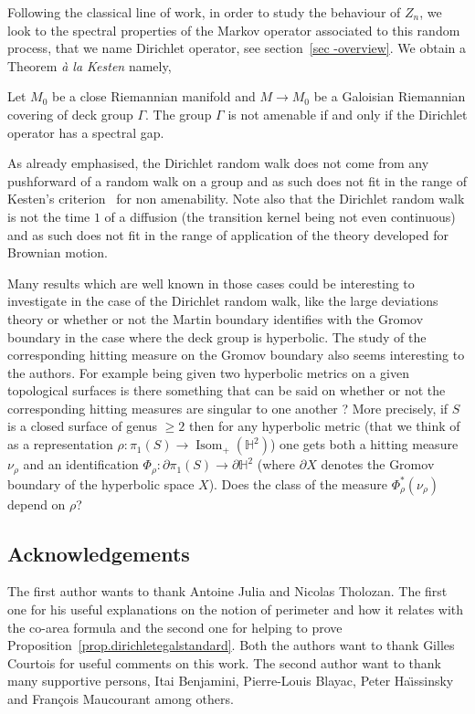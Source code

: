 \documentclass[AHL,Unicode,longabstracts,published]{cedram}
\DeclareMathOperator{\Isom}{Isom}
\newcommand{\HH}{\mathbb{H}}
\newcommand{\G}{\Gamma}
\begin{document}
Following the classical line of work, in order to study the behaviour of $Z_n$, we look to the spectral properties of the Markov operator associated to this random process, that we name Dirichlet operator, see section~\ref{sec -overview}. We obtain a Theorem \emph{à la Kesten} namely,

\begin{theo}\label{theo-Kesten for Dirichlet}
\label{theo-spectral gap}
Let $M_0$ be a close Riemannian manifold and $M \to M_0$ be a Galoisian Riemannian covering of deck group $\Gamma$. The group $\G$ is not amenable if and only if the Dirichlet operator has a spectral gap.
\end{theo}

As already emphasised, the Dirichlet random walk does not come from any pushforward of a random walk on a group and as such does not fit in the range of Kesten's criterion~\cite{artkestenamenable} for non amenability. Note also that the Dirichlet random walk is not the time $1$ of a diffusion (the transition kernel being not even continuous) and as such does not fit in the range of application of the theory developed for Brownian motion. 


Many results which are well known in those cases could be interesting to investigate in the case of the Dirichlet random walk, like the large deviations theory or whether or not the Martin boundary identifies with the Gromov boundary in the case where the deck group is hyperbolic. The study of the corresponding hitting measure on the Gromov boundary also seems interesting to the authors. For example being given two hyperbolic metrics on a given topological surfaces is there something that can be said on whether or not the corresponding hitting measures are singular to one another ? More precisely, if $S$ is a closed surface of genus $\ge 2$ then for any hyperbolic metric (that we think of as a representation $\rho : \pi_1(S) \to \Isom_+(\HH^2)$) one gets both a hitting measure $\nu_\rho$ and an identification $\Phi_{\rho} : \partial \pi_1(S) \to \partial \HH^2$ (where $\partial X$ denotes the Gromov boundary of the hyperbolic space $X$). Does the class of the measure $\Phi_{\rho}^*(\nu_{\rho})$ depend on $\rho$? 



\subsection*{Acknowledgements}
The first author wants to thank Antoine Julia and Nicolas Tholozan. The first one for his useful explanations on the notion of perimeter and how it relates with the co-area formula and the second one for helping to prove Proposition~\ref{prop.dirichletegalstandard}. Both the authors want to thank Gilles Courtois for useful comments on this work. The second author want to thank many supportive persons, Itai Benjamini, Pierre-Louis Blayac, Peter Ha{\"\i}ssinsky and François Maucourant among others.
\end{document}
